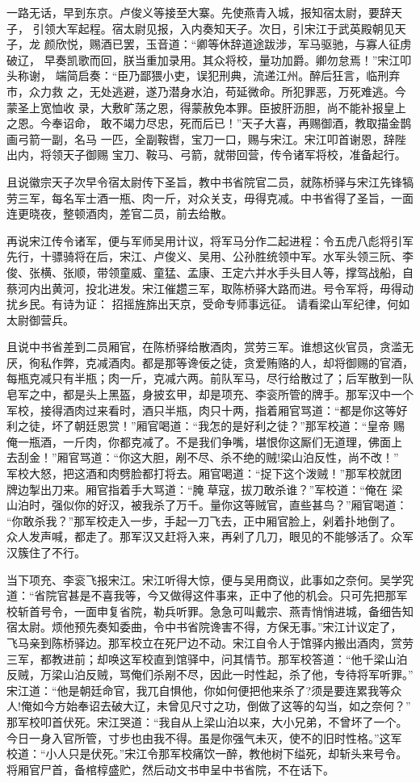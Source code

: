 一路无话，早到东京。卢俊义等接至大寨。先使燕青入城，报知宿太尉，要辞天子，
引领大军起程。宿太尉见报，入内奏知天子。次日，引宋江于武英殿朝见天子，龙
颜欣悦，赐酒已罢，玉音道：“卿等休辞道途跋涉，军马驱驰，与寡人征虏破辽，
早奏凯歌而回，朕当重加录用。其众将校，量功加爵。卿勿怠焉！”宋江叩头称谢，
端简启奏：“臣乃鄙猥小吏，误犯刑典，流递江州。醉后狂言，临刑弃市，众力救
之，无处逃避，遂乃潜身水泊，苟延微命。所犯罪恶，万死难逃。今蒙圣上宽恤收
录，大敷旷荡之恩，得蒙赦免本罪。臣披肝沥胆，尚不能补报皇上之恩。今奉诏命，
敢不竭力尽忠，死而后已！”天子大喜，再赐御酒，教取描金鹊画弓箭一副，名马
一匹，全副鞍辔，宝刀一口，赐与宋江。宋江叩首谢恩，辞陛出内，将领天子御赐
宝刀、鞍马、弓箭，就带回营，传令诸军将校，准备起行。

且说徽宗天子次早令宿太尉传下圣旨，教中书省院官二员，就陈桥驿与宋江先锋犒
劳三军，每名军士酒一瓶、肉一斤，对众关支，毋得克减。中书省得了圣旨，一面
连更晓夜，整顿酒肉，差官二员，前去给散。

再说宋江传令诸军，便与军师吴用计议，将军马分作二起进程：令五虎八彪将引军
先行，十骠骑将在后，宋江、卢俊义、吴用、公孙胜统领中军。水军头领三阮、李
俊、张横、张顺，带领童威、童猛、孟康、王定六并水手头目人等，撑驾战船，自
蔡河内出黄河，投北进发。宋江催趱三军，取陈桥驿大路而进。号令军将，毋得动
扰乡民。有诗为证：
招摇旌旆出天京，受命专师事远征。
请看梁山军纪律，何如太尉御营兵。

且说中书省差到二员厢官，在陈桥驿给散酒肉，赏劳三军。谁想这伙官员，贪滥无
厌，徇私作弊，克减酒肉。都是那等谗佞之徒，贪爱贿赂的人，却将御赐的官酒，
每瓶克减只有半瓶；肉一斤，克减六两。前队军马，尽行给散过了；后军散到一队
皂军之中，都是头上黑盔，身披玄甲，却是项充、李衮所管的牌手。那军汉中一个
军校，接得酒肉过来看时，酒只半瓶，肉只十两，指着厢官骂道：“都是你这等好
利之徒，坏了朝廷恩赏！”厢官喝道：“我怎的是好利之徒？”那军校道：“皇帝
赐俺一瓶酒，一斤肉，你都克减了。不是我们争嘴，堪恨你这厮们无道理，佛面上
去刮金！”厢官骂道：“你这大胆，剐不尽、杀不绝的贼!梁山泊反性，尚不改！”
军校大怒，把这酒和肉劈脸都打将去。厢官喝道：“捉下这个泼贼！”那军校就团
牌边掣出刀来。厢官指着手大骂道：“腌草寇，拔刀敢杀谁？”军校道：“俺在
梁山泊时，强似你的好汉，被我杀了万千。量你这等贼官，直些甚鸟？”厢官喝道：
“你敢杀我？”那军校走入一步，手起一刀飞去，正中厢官脸上，剁着扑地倒了。
众人发声喊，都走了。那军汉又赶将入来，再剁了几刀，眼见的不能够活了。众军
汉簇住了不行。

当下项充、李衮飞报宋江。宋江听得大惊，便与吴用商议，此事如之奈何。吴学究
道：“省院官甚是不喜我等，今又做得这件事来，正中了他的机会。只可先把那军
校斩首号令，一面申复省院，勒兵听罪。急急可叫戴宗、燕青悄悄进城，备细告知
宿太尉。烦他预先奏知委曲，令中书省院谗害不得，方保无事。”宋江计议定了，
飞马亲到陈桥驿边。那军校立在死尸边不动。宋江自令人于馆驿内搬出酒肉，赏劳
三军，都教进前；却唤这军校直到馆驿中，问其情节。那军校答道：“他千梁山泊
反贼，万梁山泊反贼，骂俺们杀剐不尽，因此一时性起，杀了他，专待将军听罪。”
宋江道：“他是朝廷命官，我兀自惧他，你如何便把他来杀了?须是要连累我等众
人!俺如今方始奉诏去破大辽，未曾见尺寸之功，倒做了这等的勾当，如之奈何？”
那军校叩首伏死。宋江哭道：“我自从上梁山泊以来，大小兄弟，不曾坏了一个。
今日一身入官所管，寸步也由我不得。虽是你强气未灭，使不的旧时性格。”这军
校道：“小人只是伏死。”宋江令那军校痛饮一醉，教他树下缢死，却斩头来号令。
将厢官尸首，备棺椁盛贮，然后动文书申呈中书省院，不在话下。

